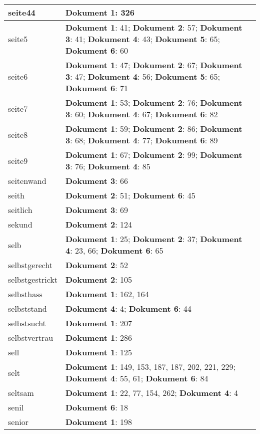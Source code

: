 \documentclass[a5paper]{article}
\begin{document}
\begin{longtable}[l]{|l|p{3in}|}
\hline
seite44 & \textbf{Dokument 1}: 326 \\
\hline
seite5 & \textbf{Dokument 1}: 41; \textbf{Dokument 2}: 57; \textbf{Dokument 3}: 41; \textbf{Dokument 4}: 43; \textbf{Dokument 5}: 65; \textbf{Dokument 6}: 60 \\
\hline
seite6 & \textbf{Dokument 1}: 47; \textbf{Dokument 2}: 67; \textbf{Dokument 3}: 47; \textbf{Dokument 4}: 56; \textbf{Dokument 5}: 65; \textbf{Dokument 6}: 71 \\
\hline
seite7 & \textbf{Dokument 1}: 53; \textbf{Dokument 2}: 76; \textbf{Dokument 3}: 60; \textbf{Dokument 4}: 67; \textbf{Dokument 6}: 82 \\
\hline
seite8 & \textbf{Dokument 1}: 59; \textbf{Dokument 2}: 86; \textbf{Dokument 3}: 68; \textbf{Dokument 4}: 77; \textbf{Dokument 6}: 89 \\
\hline
seite9 & \textbf{Dokument 1}: 67; \textbf{Dokument 2}: 99; \textbf{Dokument 3}: 76; \textbf{Dokument 4}: 85 \\
\hline
seitenwand & \textbf{Dokument 3}: 66 \\
\hline
seith & \textbf{Dokument 2}: 51; \textbf{Dokument 6}: 45 \\
\hline
seitlich & \textbf{Dokument 3}: 69 \\
\hline
sekund & \textbf{Dokument 2}: 124 \\
\hline
selb & \textbf{Dokument 1}: 25; \textbf{Dokument 2}: 37; \textbf{Dokument 4}: 23, 66; \textbf{Dokument 6}: 65 \\
\hline
selbstgerecht & \textbf{Dokument 2}: 52 \\
\hline
selbstgestrickt & \textbf{Dokument 2}: 105 \\
\hline
selbsthass & \textbf{Dokument 1}: 162, 164 \\
\hline
selbststand & \textbf{Dokument 4}: 4; \textbf{Dokument 6}: 44 \\
\hline
selbstsucht & \textbf{Dokument 1}: 207 \\
\hline
selbstvertrau & \textbf{Dokument 1}: 286 \\
\hline
sell & \textbf{Dokument 1}: 125 \\
\hline
selt & \textbf{Dokument 1}: 149, 153, 187, 187, 202, 221, 229; \textbf{Dokument 4}: 55, 61; \textbf{Dokument 6}: 84 \\
\hline
seltsam & \textbf{Dokument 1}: 22, 77, 154, 262; \textbf{Dokument 4}: 4 \\
\hline
senil & \textbf{Dokument 6}: 18 \\
\hline
senior & \textbf{Dokument 1}: 198 \\

\end{longtable}
\end{document}
